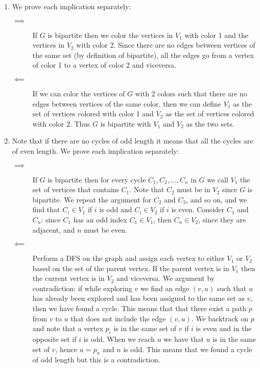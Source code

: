 \documentclass[10pt]{article}
\begin{document}
\begin{enumerate}
    \item We prove each implication separately:
          \begin{description}
              \item[$\implies$] If $G$ is bipartite then we color the vertices in $V_1$ with color 1 and the vertices in $V_2$ with color 2.
                  Since there are no edges between vertices of the same set (by definition of bipartite),
                  all the edges go from a vertex of color 1 to a vertex of color 2 and viceversa.
              \item[$\impliedby$] If we can color the vertices of $G$ with 2 colors such that there are no edges between vertices of the same color,
                  then we can define $V_1$ as the set of vertices colored with color 1 and $V_2$ as the set of vertices colored with color 2.
                  Thus $G$ is bipartite with $V_1$ and $V_2$ as the two sets.
          \end{description}
    \item Note that if there are no cycles of odd length it means that all the cycles are of even length.
          We prove each implication separately:
          \begin{description}
              \item[$\implies$] If $G$ is bipartite then for every cycle $C_1, C_2, \ldots, C_n$ in $G$
                  we call $V_1$ the set of vertices that contains $C_1$. Note that $C_2$ must be in $V_2$ since $G$ is bipartite.
                  We repeat the argument for $C_2$ and $C_3$, and so on, and we find that $C_i \in V_1$ if $i$ is odd and $C_i \in V_2$ if $i$ is even.
                  Consider $C_1$ and $C_n$: since $C_1$ has an odd index $C_1 \in V_1$, then $C_n \in V_2$, since they are adjacent, and $n$ must be even.
              \item[$\impliedby$] Perform a DFS on the graph and assign each vertex to either $V_1$ or $V_2$ based on the set of the parent vertex.
                  If the parent vertex is in $V_1$ then the current vertex is in $V_2$ and viceversa.
                  We argument by contradiction: if while exploring $v$ we find an edge $(v, u)$ such that $u$ has already been explored and
                  has been assigned to the same set as $v$, then we have found a cycle. This means that that there exist a path $p$ from $v$ to $u$ that does not include the edge $(v, u)$.
                  We backtrack on $p$ and note that a vertex $p_i$ is in the same set of $v$ if $i$ is even and in the opposite set if $i$ is odd.
                  When we reach $u$ we have that $u$ is in the same set of $v$, hence $u = p_n$ and $n$ is odd.
                  This means that we found a cycle of odd length but this is a contradiction.
          \end{description}


\end{enumerate}
\end{document}
